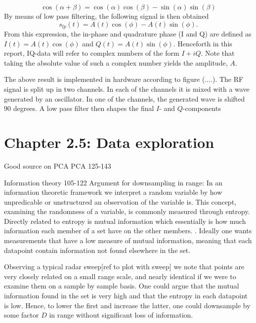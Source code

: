 \documentclass[a4paper, 12pt]{article}
\begin{document}
\begin{equation}
	\label{eq:IQtrig}
	\cos(\alpha+\beta) = \cos(\alpha)\cos(\beta)-\sin(\alpha)\sin(\beta)
\end{equation}
By means of low pass filtering, the following signal is then obtained
\begin{equation}
	s_{lp}(t)=A(t)\cos(\phi)-A(t)\sin(\phi).
\end{equation}
From this expression, the in-phase and quadrature phase (I and Q) are defined as $I(t)=A(t)\cos(\phi)$ and $Q(t)=A(t)\sin(\phi)$. Henceforth in this report, IQ-data will refer to complex numbers of the form $I+i Q$. Note that taking the absolute value of such a complex number yields the amplitude, $A$.

The above result is implemented in hardware according to figure (....). The RF signal is split up in two channels. In each of the channels it is mixed with a wave generated by an oscillator. In one of the channels, the generated wave is shifted 90 degrees. A low pass filter then shapes the final $I$- and $Q$-components

\section{Chapter 2.5: Data exploration}

Good source on PCA
\cite{hyvasrinen_karhunen_oja_2004}
PCA 125-143

Information theory
105-122
Argument for downsampling in range: In an information theoretic framework we interpret a random variable by how unpredicable or unstructured an observation of the variable is. This concept, examining the randomness of a variable, is commonly measured through entropy. Directly related to entropy is mutual information which essentially is how much information each member of a set have on the other members. \cite{hyvasrinen_karhunen_oja_2004}. Ideally one wants measurements that have a low measure of mutual information, meaning that each datapoint contain information not found elsewhere in the set. 

Observing a typical radar sweep[ref to plot with sweep] we note that points are very closely related on a small range scale, and nearly identical if we were to examine them on a sample by sample basis. One could argue that the mutual information found in the set is very high and that the entropy in each datapoint is low. Hence, to lower the first and increase the latter, one could downsample by some factor $D$ in range without significant loss of information.
\end{document}
